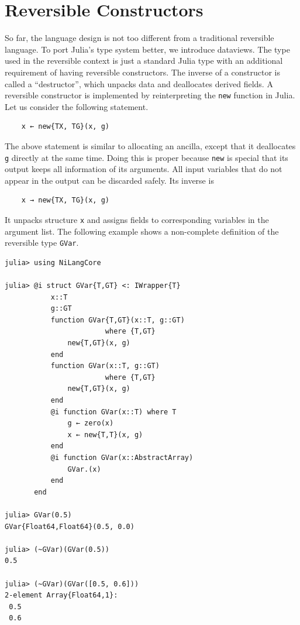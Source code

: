 \documentclass{article}
\newcommand{\<}{\langle}
\renewcommand{\>}{\rangle}
\theoremstyle{definition}\newtheorem{definition}{\textit{Definition}}
\begin{document}
\section{Reversible Constructors}\label{app:constructor}
So far, the language design is not too different from a traditional reversible language. To port Julia's type system better, we introduce dataviews.
The type used in the reversible context is just a standard Julia type with an additional requirement of having reversible constructors.
The inverse of a constructor is called a ``destructor'', which unpacks data and deallocates derived fields.
A reversible constructor is implemented by reinterpreting the \texttt{new} function in Julia.
Let us consider the following statement.

\begin{minipage}{.88\columnwidth}
\begin{lstlisting}
    x ← new{TX, TG}(x, g)
\end{lstlisting}
\end{minipage}

The above statement is similar to allocating an ancilla, except that it deallocates \texttt{g} directly at the same time.
Doing this is proper because \texttt{new} is special that its output keeps all information of its arguments. All input variables that do not appear in the output can be discarded safely. Its inverse is

\begin{minipage}{.88\columnwidth}
\begin{lstlisting}
    x → new{TX, TG}(x, g)
\end{lstlisting}
\end{minipage}

It unpacks structure \texttt{x} and assigns fields to corresponding variables in the argument list.
The following example shows a non-complete definition of the reversible type \texttt{GVar}.

\begin{minipage}{\columnwidth}
\begin{lstlisting}[multicols=2]
julia> using NiLangCore

julia> @i struct GVar{T,GT} <: IWrapper{T}
           x::T
           g::GT
           function GVar{T,GT}(x::T, g::GT)
                        where {T,GT}
               new{T,GT}(x, g)
           end
           function GVar(x::T, g::GT)
                        where {T,GT}
               new{T,GT}(x, g)
           end
           @i function GVar(x::T) where T
               g ← zero(x)
               x ← new{T,T}(x, g)
           end
           @i function GVar(x::AbstractArray)
               GVar.(x)
           end
       end

julia> GVar(0.5)
GVar{Float64,Float64}(0.5, 0.0)

julia> (~GVar)(GVar(0.5))
0.5

julia> (~GVar)(GVar([0.5, 0.6]))
2-element Array{Float64,1}:
 0.5
 0.6
\end{lstlisting}
\end{minipage}
\end{document}
